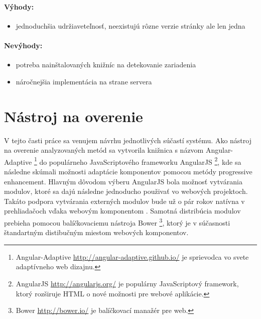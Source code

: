 \paragraph{Výhody:}
\begin{itemize}
	\item jednoduchšia udržiaveteľnosť, neexistujú rôzne verzie stránky ale len jedna
\end{itemize}

\paragraph{Nevýhody:}
\begin{itemize}
	\item potreba nainštalovaných knižníc na detekovanie zariadenia
	\item náročnejšia implementácia na strane servera
\end{itemize}



\newpage
\section{Nástroj na overenie} %
\label{sec:n_stroj_na_overenie}

V tejto časti práce sa venujem návrhu jednotlivých súčastí systému. Ako nástroj na overenie analyzovaných metód sa vytvorila knižnica s názvom Angular-Adaptive \footnote{Angular-Adaptive \url{http://angular-adaptive.github.io/} je sprievodca vo svete adaptívneho web dizajnu.} do populárneho JavaScriptového frameworku AngularJS \footnote{AngularJS \url{http://angularjs.org/} je populárny JavaScriptový framework, ktorý rozširuje HTML o nové možnosti pre webové aplikácie.}, kde sa následne skúmali možnosti adaptácie komponentov pomocou metódy progressive enhancement. Hlavným dôvodom výberu AngularJS bola možnosť vytvárania modulov, ktoré sa dajú následne jednoducho použivať vo webových projektoch. Takáto podpora vytvárania externých modulov bude už o pár rokov natívna v prehliadačoch vďaka webovým komponentom \cite{webcomponents}. Samotná distribúcia modulov prebieha pomocou balíčkovaciemu nástroja Bower \footnote{Bower \url{http://bower.io/} je balíčkovací manažér pre web.}, ktorý je v súčasnosti štandartným distibučným miestom webových komponentov.

